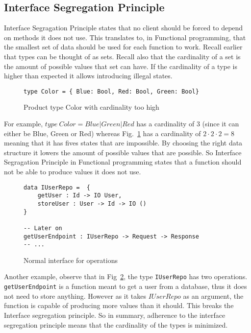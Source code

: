 \subsection{Interface Segregation Principle} 

Interface Segragation Principle states that no client should be forced to depend
on methods it does not use. This translates to, in Functional programming, that
the smallest set of data should be used for each function to work. Recall
earlier that types can be thought of as sets. Recall also that the cardinality
of a set is the amount of possible values that set can have. If the cardinality
of a type is higher than expected it allows introducing illegal states. 

\begin{figure}[H]
    \begin{lstlisting}
type Color = { Blue: Bool, Red: Bool, Green: Bool}
    \end{lstlisting}
    \caption{Product type Color with cardinality too high}
    \label{colorcardinality}
\end{figure}


For example, $type\ Color = Blue | Green | Red$ has a cardinality of 3 (since it
can either be Blue, Green or Red) whereas Fig.~\ref{colorcardinality} has a
cardinality of $2\cdot 2\cdot 2 = 8$ meaning that it has fives states that are
impossible. By choosing the right data structure it lowers the amount of
possible values that are possible. So Interface Segragation Principle in
Functional programming states that a function should not be able to produce
values it does not use.

\begin{figure}[H]
    \begin{lstlisting}
data IUserRepo =  {
	getUser : Id -> IO User,
	storeUser : User -> Id -> IO ()
}

-- Later on
getUserEndpoint : IUserRepo -> Request -> Response
-- ...
    \end{lstlisting}
    \caption{Normal interface for operations}
    \label{twomanyoperations}
\end{figure}


Another example, observe that in Fig~\ref{twomanyoperations}, the type
\texttt{IUserRepo} has two operations. \texttt{getUserEndpoint} is a function
meant to get a user from a database, thus it does not need to store anything.
However as it takes $IUserRepo$ as an argument, the function is capable of
producing more values than it should. This breaks the Interface segregation
principle. So in summary, adherence to the interface segregation principle means
that the cardinality of the types is minimized.

